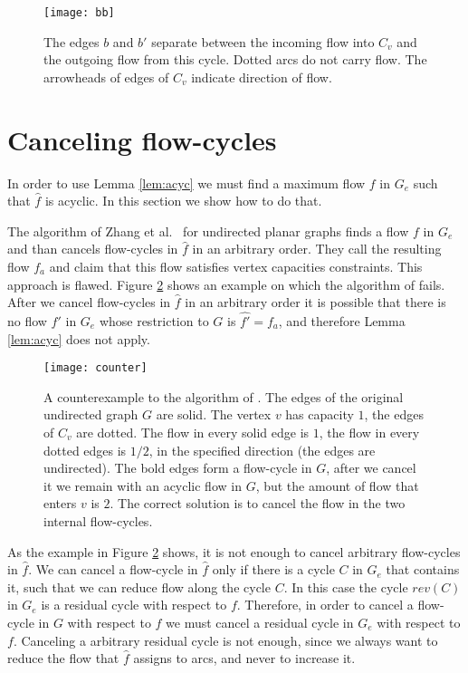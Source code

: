 \documentclass[a4paper,11pt]{article}
\begin{document}
\begin{figure}
    \centering
    \texttt{[image: bb]}
    \caption{The edges $b$ and $b'$ separate between the incoming flow into $C_v$ and the outgoing flow from this cycle. Dotted arcs do not carry flow. The arrowheads of edges of $C_v$ indicate direction of flow.}
    \label{fig:bb}
\end{figure}

\section{Canceling flow-cycles} \label{sec:canc}

In order to use Lemma \ref{lem:acyc} we must find a maximum flow $f$ in $G_e$
such that $\hat{f}$ is acyclic. In this section we show how to do
that.

The algorithm of Zhang et al.~\cite[Section 3]{ZLC08} for undirected planar
graphs finds a flow $f$ in $G_e$ and than cancels flow-cycles  in
$\hat{f}$ in an arbitrary order. They call the resulting flow $f_a$
and claim that this flow satisfies vertex capacities constraints.
This approach is flawed.  Figure \ref{fig:counter} shows an example
on which the algorithm of \cite{ZLC08} fails. After we cancel
flow-cycles in $\hat{f}$ in an arbitrary order it is possible that
there is no flow $f'$ in $G_e$ whose restriction to $G$ is $\hat{f'} = f_a$,
and  therefore Lemma \ref{lem:acyc} does not apply.

\begin{figure}
    \centering
    \texttt{[image: counter]}
    \caption{A counterexample to the algorithm of \cite{ZLC08}.
    The edges of the original undirected graph $G$ are solid. The vertex $v$ has capacity $1$, the edges of $C_v$ are dotted.
     The flow in every solid edge is $1$, the flow in every dotted edges is $1/2$, in the specified direction (the edges are undirected). The bold edges form a flow-cycle in $G$, after we cancel it we remain with an acyclic flow in $G$, but the amount of flow that enters $v$ is $2$. The correct solution is to cancel the flow in the two internal flow-cycles.}
    \label{fig:counter}
\end{figure}

As the example in Figure \ref{fig:counter} shows, it is not enough
to cancel arbitrary flow-cycles in $\hat{f}$. We can cancel a flow-cycle
in $\hat{f}$ only if there is a cycle $C$ in $G_e$ that contains it, such that
we can reduce flow along the cycle $C$. In this case the cycle $rev(C)$ in $G_e$
is a residual cycle with respect to $f$. Therefore, in order to cancel a
flow-cycle in $G$ with respect to $\hat{f}$ we must cancel a residual cycle in
$G_e$ with respect to $f$. Canceling a arbitrary residual cycle is not enough,
since we always want to reduce the flow that $\hat{f}$ assigns to arcs, and never
to increase it.
\end{document}
